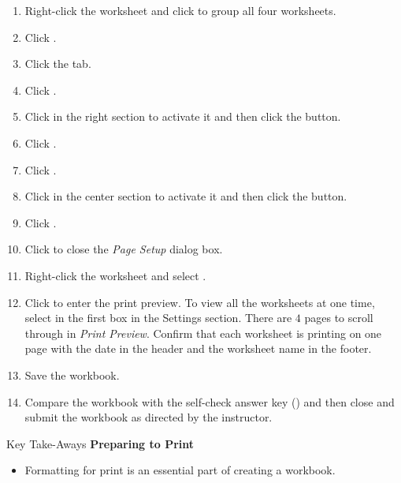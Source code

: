 \begin{enumerate}[resume]
	\item Right-click the  worksheet and click  to group all four worksheets. 
	\item Click .
	\item Click the  tab.
	\item Click .
	\item Click in the right section to activate it and then click the  button.
	\item Click .
	\item Click .
	\item Click in the center section to activate it and then click the  button.
	\item Click .
	\item Click  to close the \textit{Page Setup} dialog box.
	\item Right-click the  worksheet and select .
	\item Click  to enter the print preview. To view all the worksheets at one time, select  in the first box in the Settings section. There are $ 4 $ pages to scroll through in \textit{Print Preview}. Confirm that each worksheet is printing on one page with the date in the header and the worksheet name in the footer.
	\item Save the  workbook.

\item Compare the workbook with the self-check answer key () and then close and submit the  workbook as directed by the instructor.
	
\end{enumerate}

\begin{center}
	\begin{tkwbox}{Key Take-Aways}
		\textbf{Preparing to Print}
		\\
		\begin{itemize}
			\setlength{\itemsep}{0pt}
			\setlength{\parskip}{0pt}
			\setlength{\parsep}{0pt}
			
			\item Formatting for print is an essential part of creating a workbook.
			
		\end{itemize}
	\end{tkwbox}
\end{center}


